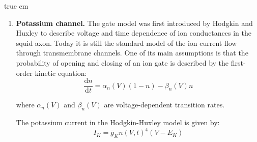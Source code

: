 \documentclass[12pt]{article}
\newcommand{\tderiv}[1]{\frac{\mathrm{d}#1}{\mathrm{d}t}}
\begin{document}
 true cm
\begin{enumerate}
\item \textbf{Potassium channel.} The gate model was first introduced by
    Hodgkin and Huxley to describe voltage and time dependence of
    ion conductances in the squid axon. Today it is still the standard model
    of the ion current flow through transmembrane channels. One of its main
    assumptions is that the probability of opening and closing of an ion
    gate is described by the first-order kinetic equation:
    \begin{equation}
        \tderiv{n}=\alpha_n(V)(1-n)-\beta_n(V)n
        \label{eq:activation}
    \end{equation}

    where $\alpha_n(V)$ and $\beta_n(V)$ are voltage-dependent transition
    rates.

    The potassium current in the Hodgkin-Huxley model is given by:
    \begin{equation}
        I_K=\bar{g}_{K} n(V,t)^4 (V-E_K)
        \label{eq:potassium}
    \end{equation}


\end{enumerate}
\end{document}
